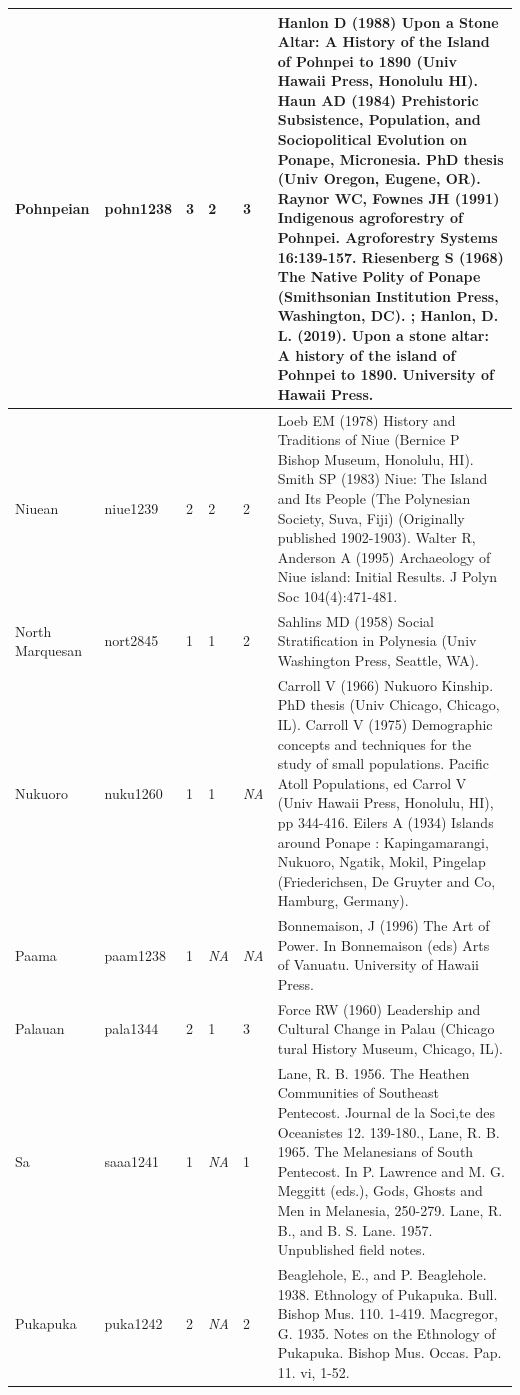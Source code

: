 \documentclass[a4paper,10pt]{article} %
\begin{document}
\begin{landscape}
\begin{longtable}{ | p{2cm}| p{2cm}| p{1.8cm}| p{1.8cm}| p{3cm}| p{9cm}| }
Pohnpeian&pohn1238&3&2&3&Hanlon D (1988) Upon a Stone Altar: A History of the Island of Pohnpei to 1890 (Univ Hawaii Press, Honolulu HI). Haun AD (1984) Prehistoric Subsistence, Population, and Sociopolitical Evolution on Ponape, Micronesia. PhD thesis (Univ Oregon, Eugene, OR). Raynor WC, Fownes JH (1991) Indigenous agroforestry of Pohnpei. Agroforestry Systems 16:139-157. Riesenberg S (1968) The Native Polity of Ponape (Smithsonian Institution Press, Washington, DC). ; Hanlon, D. L. (2019). Upon a stone altar: A history of the island of Pohnpei to 1890. University of Hawaii Press.\\ \hline
Niuean&niue1239&2&2&2&Loeb EM (1978) History and Traditions of Niue (Bernice P Bishop Museum, Honolulu, HI). Smith SP (1983) Niue: The Island and Its People (The Polynesian Society, Suva, Fiji) (Originally published 1902-1903). Walter R, Anderson A (1995) Archaeology of Niue island: Initial Results. J Polyn Soc 104(4):471-481. \\ \hline
North Marquesan&nort2845&1&1&2&Sahlins MD (1958) Social Stratification in Polynesia (Univ Washington Press, Seattle, WA).\\ \hline
Nukuoro&nuku1260&1&1&\emph{NA}&Carroll V (1966) Nukuoro Kinship. PhD thesis (Univ Chicago, Chicago, IL). Carroll V (1975) Demographic concepts and techniques for the study of small populations. Pacific Atoll Populations, ed Carrol V (Univ Hawaii Press, Honolulu, HI), pp 344-416. Eilers A (1934) Islands around Ponape : Kapingamarangi, Nukuoro, Ngatik, Mokil, Pingelap (Friederichsen, De Gruyter and Co, Hamburg, Germany). \\ \hline
Paama&paam1238&1&\emph{NA}&\emph{NA}&Bonnemaison, J (1996) The Art of Power. In Bonnemaison (eds) Arts of Vanuatu. University of Hawaii Press.\\ \hline
Palauan&pala1344&2&1&3&Force RW (1960) Leadership and Cultural Change in Palau (Chicago tural History Museum, Chicago, IL).\\ \hline
Sa&saaa1241&1&\emph{NA}&1&Lane, R. B. 1956. The Heathen Communities of Southeast Pentecost. Journal de la Soci‚te des Oceanistes 12. 139-180., Lane, R. B. 1965. The Melanesians of South Pentecost. In P. Lawrence and M. G. Meggitt (eds.), Gods, Ghosts and Men in Melanesia, 250-279. Lane, R. B., and B. S. Lane. 1957. Unpublished field notes.\\ \hline
Pukapuka&puka1242&2&\emph{NA}&2&Beaglehole, E., and P. Beaglehole. 1938. Ethnology of Pukapuka. Bull. Bishop Mus. 110. 1-419. Macgregor, G. 1935. Notes on the Ethnology of Pukapuka. Bishop Mus. Occas. Pap. 11. vi, 1-52.\\ \hline

\end{longtable}
\end{landscape}
\end{document}
